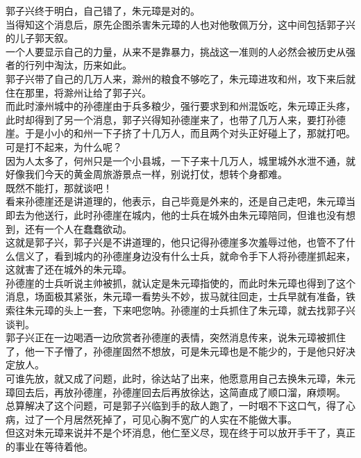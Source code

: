 \begin{multicols}{\theparacolNo}
郭子兴终于明白，自己错了，朱元璋是对的。\\

当得知这个消息后，原先企图杀害朱元璋的人也对他敬佩万分，这中间包括郭子兴的儿子郭天叙。\\

一个人要显示自己的力量，从来不是靠暴力，挑战这一准则的人必然会被历史从强者的行列中淘汰，历来如此。\\

郭子兴带了自己的几万人来，滁州的粮食不够吃了，朱元璋进攻和州，攻下来后就住在那里，将滁州让给了郭子兴。\\

而此时濠州城中的孙德崖由于兵多粮少，强行要求到和州混饭吃，朱元璋正头疼，此时却得到了另一个消息，郭子兴得知孙德崖来了，也带了几万人来，要打孙德崖。于是小小的和州一下子挤了十几万人，而且两个对头正好碰上了，那就打吧。\\

可是打不起来，为什么呢？\\

因为人太多了，何州只是一个小县城，一下子来十几万人，城里城外水泄不通，就好像我们今天的黄金周旅游景点一样，别说打仗，想转个身都难。\\

既然不能打，那就谈吧！\\

看来孙德崖还是讲道理的，他表示，自己毕竟是外来的，还是自己走吧，朱元璋当即去为他送行，此时孙德崖在城内，他的士兵在城外由朱元璋陪同，但谁也没有想到，还有一个人在蠢蠢欲动。\\

这就是郭子兴，郭子兴是不讲道理的，他只记得孙德崖多次羞辱过他，也管不了什么信义了，看到城内的孙德崖身边没有什么士兵，就命令手下人将孙德崖抓起来，这就害了还在城外的朱元璋。\\

孙德崖的士兵听说主帅被抓，就认定是朱元璋指使的，而此时朱元璋也得到了这个消息，场面极其紧张，朱元璋一看势头不妙，拔马就往回走，士兵早就有准备，铁索往朱元璋的头上一套，下来吧您呐。孙德崖的士兵抓住了朱元璋，就去找郭子兴谈判。\\

郭子兴正在一边喝酒一边欣赏者孙德崖的表情，突然消息传来，说朱元璋被抓住了，他一下子懵了，孙德崖固然不想放，可是朱元璋也是不能少的，于是他只好决定放人。\\

可谁先放，就又成了问题，此时，徐达站了出来，他愿意用自己去换朱元璋，朱元璋回去后，再放孙德崖，孙德崖回去后再放徐达，这简直成了顺口溜，麻烦啊。\\

总算解决了这个问题，可是郭子兴临到手的敌人跑了，一时咽不下这口气，得了心病，过了一个月居然死掉了，可见心胸不宽广的人实在不能做大事。\\

但这对朱元璋来说并不是个坏消息，他仁至义尽，现在终于可以放开手干了，真正的事业在等待着他。\\
\ifnum{}
	\end{multicols}
\fi
\newpage
